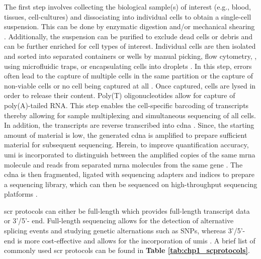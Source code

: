 The first step involves collecting the biological sample(s) of interest (e.g., blood, tissues, cell-cultures) and dissociating into individual cells to obtain a single-cell suspension. This can be done by enzymatic digestion and/or mechanical shearing \textbf{\cite{vieira_braga_tissue_2019}}. Additionally, the suspension can be purified to exclude dead cells or debris and can be further enriched for cell types of interest. Individual cells are then isolated and sorted into separated containers or wells by manual picking, \textbf{\cite{tang_mrna-seq_2009,kalisky_brief_2018,guo_resolution_2010}}
flow cytometry, \textbf{\cite{hayashi_single-cell_2010,jaitin_massively_2014}}, 
using microfluidic traps, \textbf{\cite{kalisky_brief_2018,treutlein_reconstructing_2014,streets_microfluidic_2014}} 
or encapsulating cells into droplets \textbf{\cite{kalisky_brief_2018,klein_droplet_2015,macosko_highly_2015}}. In this step, errors often lead to the capture of multiple cells in the same partition or the capture of non-viable cells or no cell being captured at all \textbf{\cite{svensson_exponential_2018}}. Once captured, cells are lysed in order to release their  content. Poly(T) oligonucleotides allow for capture of poly(A)-tailed RNA. This step enables the cell-specific barcoding of transcripts thereby allowing for sample multiplexing and simultaneous sequencing of all cells. In addition, the transcripts are reverse transcribed into \gls{cdna} \textbf{\cite{svensson_exponential_2018,haque_practical_2017}}. Since, the starting amount of material is low, the generated \gls{cdna} is amplified to prepare sufficient material for subsequent sequencing. Herein, to improve quantification accuracy, \gls{umi} is incorporated to distinguish between the amplified copies of the same \gls{mrna} molecule and reads from separated \gls{mrna} molecules from the same gene \textbf{\cite{haque_practical_2017}}. The \gls{cdna} is then fragmented, ligated with sequencing adapters and indices to prepare a sequencing library, which can then be sequenced on high-throughput sequencing platforms \textbf{\cite{svensson_exponential_2018,haque_practical_2017}}.\\



\par \gls{scr} protocols can either be full-length which provides full-length transcript data or 3'/5'- end. Full-length sequencing allows for the detection of alternative splicing events and studying genetic alternations such as SNPs, whereas 3'/5'- end is more cost-effective and allows for the incorporation of \glspl{umi} \textbf{\cite{baran-gale_experimental_2018}}. A brief list of commonly used \gls{scr} protocols can be found in \textbf{Table \ref{tab:chp1_scprotocols}}.

